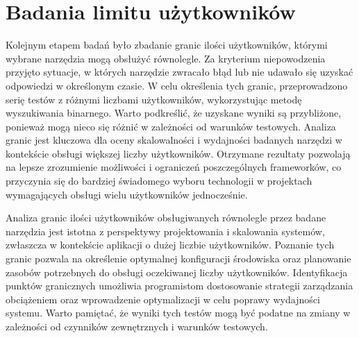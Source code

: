 \section{Badania limitu użytkowników}

Kolejnym etapem badań było zbadanie granic ilości użytkowników, którymi wybrane narzędzia mogą obsłużyć równolegle.
Za kryterium niepowodzenia przyjęto sytuacje, w których narzędzie zwracało błąd lub nie udawało się uzyskać odpowiedzi w określonym czasie.
W celu określenia tych granic, przeprowadzono serię testów z różnymi liczbami użytkowników, wykorzystując metodę wyszukiwania binarnego.
Warto podkreślić, że uzyskane wyniki są przybliżone, ponieważ mogą nieco się różnić w zależności od warunków testowych.
Analiza granic jest kluczowa dla oceny skalowalności i wydajności badanych narzędzi w kontekście obsługi większej liczby użytkowników.
Otrzymane rezultaty pozwolają na lepsze zrozumienie możliwości i ograniczeń poszczególnych frameworków, co przyczynia się do bardziej świadomego wyboru technologii w projektach wymagających obsługi wielu użytkowników jednocześnie.

Analiza granic ilości użytkowników obsługiwanych równolegle przez badane narzędzia jest istotna z perspektywy projektowania i skalowania systemów, zwłaszcza w kontekście aplikacji o dużej liczbie użytkowników.
Poznanie tych granic pozwala na określenie optymalnej konfiguracji środowiska oraz planowanie zasobów potrzebnych do obsługi oczekiwanej liczby użytkowników.
Identyfikacja punktów granicznych umożliwia programistom dostosowanie strategii zarządzania obciążeniem oraz wprowadzenie optymalizacji w celu poprawy wydajności systemu.
Warto pamiętać, że wyniki tych testów mogą być podatne na zmiany w zależności od czynników zewnętrznych i warunków testowych.